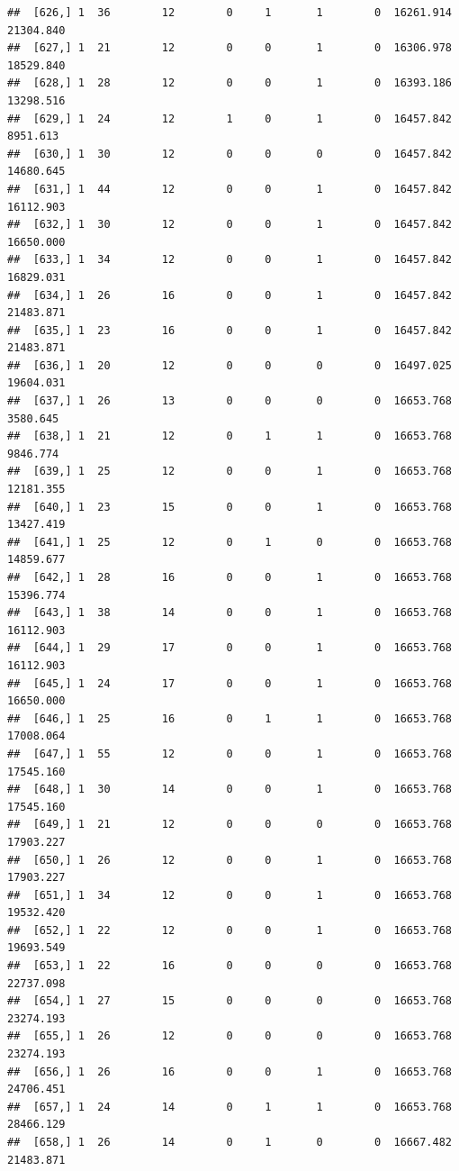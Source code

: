 \documentclass[
]{article}
\begin{document}
\begin{verbatim}
##  [626,] 1  36        12        0     1       1        0  16261.914  21304.840
##  [627,] 1  21        12        0     0       1        0  16306.978  18529.840
##  [628,] 1  28        12        0     0       1        0  16393.186  13298.516
##  [629,] 1  24        12        1     0       1        0  16457.842   8951.613
##  [630,] 1  30        12        0     0       0        0  16457.842  14680.645
##  [631,] 1  44        12        0     0       1        0  16457.842  16112.903
##  [632,] 1  30        12        0     0       1        0  16457.842  16650.000
##  [633,] 1  34        12        0     0       1        0  16457.842  16829.031
##  [634,] 1  26        16        0     0       1        0  16457.842  21483.871
##  [635,] 1  23        16        0     0       1        0  16457.842  21483.871
##  [636,] 1  20        12        0     0       0        0  16497.025  19604.031
##  [637,] 1  26        13        0     0       0        0  16653.768   3580.645
##  [638,] 1  21        12        0     1       1        0  16653.768   9846.774
##  [639,] 1  25        12        0     0       1        0  16653.768  12181.355
##  [640,] 1  23        15        0     0       1        0  16653.768  13427.419
##  [641,] 1  25        12        0     1       0        0  16653.768  14859.677
##  [642,] 1  28        16        0     0       1        0  16653.768  15396.774
##  [643,] 1  38        14        0     0       1        0  16653.768  16112.903
##  [644,] 1  29        17        0     0       1        0  16653.768  16112.903
##  [645,] 1  24        17        0     0       1        0  16653.768  16650.000
##  [646,] 1  25        16        0     1       1        0  16653.768  17008.064
##  [647,] 1  55        12        0     0       1        0  16653.768  17545.160
##  [648,] 1  30        14        0     0       1        0  16653.768  17545.160
##  [649,] 1  21        12        0     0       0        0  16653.768  17903.227
##  [650,] 1  26        12        0     0       1        0  16653.768  17903.227
##  [651,] 1  34        12        0     0       1        0  16653.768  19532.420
##  [652,] 1  22        12        0     0       1        0  16653.768  19693.549
##  [653,] 1  22        16        0     0       0        0  16653.768  22737.098
##  [654,] 1  27        15        0     0       0        0  16653.768  23274.193
##  [655,] 1  26        12        0     0       0        0  16653.768  23274.193
##  [656,] 1  26        16        0     0       1        0  16653.768  24706.451
##  [657,] 1  24        14        0     1       1        0  16653.768  28466.129
##  [658,] 1  26        14        0     1       0        0  16667.482  21483.871

\end{verbatim}
\end{document}
